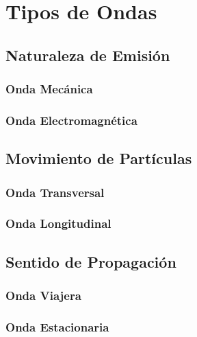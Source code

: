 \chapter{Tipos de Ondas}%
\section{Naturaleza de Emisión}%
\subsection{Onda Mecánica}

\subsection{Onda Electromagnética}

\section{Movimiento de Partículas}
\subsection{Onda Transversal}

\subsection{Onda Longitudinal}

\section{Sentido de Propagación}
\subsection{Onda Viajera}

\subsection{Onda Estacionaria}

